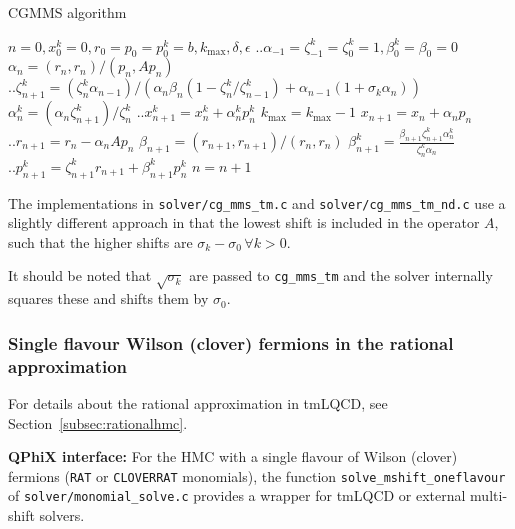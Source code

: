 \begin{algorithm}
  \caption{CGMMS algorithm}
  \label{alg:cgm}
  \begin{algorithmic}[1]
    \vspace{.2cm}
    \STATE $n=0, x_0^k = 0, r_0 = p_0 = p_0^k = b, k_\mathrm{max},
    \delta, \epsilon$
    \STATE  $\biggl.\biggr.\alpha_{-1} = \zeta_{-1}^k = \zeta_0^k = 1, \beta_0^k = \beta_0 = 0$
    \REPEAT
    \STATE $\alpha_n = (r_n, r_n) / (p_n, A p_n)$
    \STATE $\biggl.\biggr.\zeta_{n+1}^k = (\zeta^k_n  \alpha_{n-1}) / 
      (\alpha_n \beta_n(1 - \zeta_n^k / \zeta^k_{n-1}) + \alpha_{n-1}
      (1+\sigma_k\alpha_n))$
    \STATE $\alpha^k_n = (\alpha_n \zeta_{n+1}^k)/ \zeta_n^k$
    \STATE $\biggl.\biggr.x_{n+1}^k = x_n^k + \alpha_n^k p_n^k$
    \STATE $k_\mathrm{max} = k_\mathrm{max} -1$
    \ENDIF
    \ENDFOR
    \STATE $x_{n+1} = x_n + \alpha_n p_n$
    \STATE $\biggl.\biggr.r_{n+1} = r_n - \alpha_n Ap_n$
    \STATE $\beta_{n+1} = (r_{n+1}, r_{n+1}) / (r_n, r_n)$
    \STATE $\beta_{n+1}^k = \frac{\beta_{n+1} \zeta_{n+1}^k \alpha_n^k}{\zeta_{n}^k\alpha_n}$
    \STATE $\biggl.\biggr.p_{n+1}^k = \zeta_{n+1}^k r_{n+1} + \beta_{n+1}^k p_n^k$
    \STATE $n=n+1$
  \end{algorithmic}
\end{algorithm}

The implementations in \texttt{solver/cg\_mms\_tm.c} and \texttt{solver/cg\_mms\_tm\_nd.c} use a slightly different approach in that the lowest shift is included in the operator $A$, such that the higher shifts are $\sigma_k-\sigma_0\, \forall k > 0$.

It should be noted that $\sqrt{\sigma_k}$ are passed to \texttt{cg\_mms\_tm} and the solver internally squares these and shifts them by $\sigma_0$.

\subsubsection{Single flavour Wilson (clover) fermions in the rational approximation}

For details about the rational approximation in tmLQCD, see Section~\ref{subsec:rationalhmc}.

\textbf{QPhiX interface:} For the HMC with a single flavour of Wilson (clover) fermions (\texttt{RAT} or \texttt{CLOVERRAT} monomials), the function \texttt{solve\_mshift\_oneflavour} of \texttt{solver/monomial\_solve.c} provides a wrapper for tmLQCD or external multi-shift solvers.

